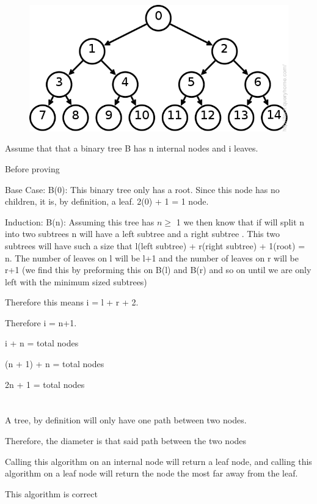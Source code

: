 \documentclass[11pt]{article} %
\begin{document}
\section{}
\begin{figure}
\includegraphics[width=\linewidth]{tree.png}
\end{figure}
Assume that that a binary tree B has n internal nodes and i leaves.

Before proving 

Base Case: B(0): This binary tree only has a root. Since this node has no children, it is, by definition, a leaf. 2(0) + 1 = 1 node.

Induction: B(n): Assuming this tree has $n\geq$ 1 we then know that if will split n into two subtrees n will have a left subtree and a right subtree . This two subtrees will have such a size that l(left subtree) + r(right subtree) + 1(root) = n. The number of leaves on l will be l+1 and the number of leaves on r will be r+1 (we find this by preforming this on B(l) and B(r) and so on until we are only left with the minimum sized subtrees) 


Therefore this means i = l + r + 2. 


Therefore i = n+1.


i + n = total nodes


(n + 1) + n = total nodes 

2n + 1 = total nodes

\section{}

A tree, by definition will only have one path between two nodes.

Therefore, the diameter is that said path between the two nodes

Calling this algorithm on an internal node will return a leaf node, and calling this algorithm on a leaf node will return the node the most far away from the leaf.

This algorithm is correct
\end{document}
